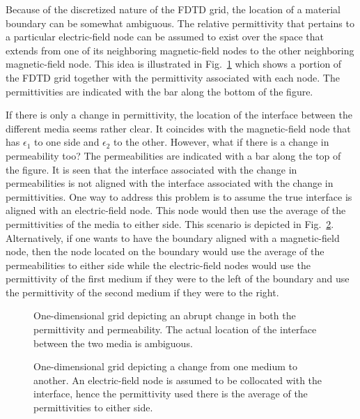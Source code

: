 Because of the discretized nature of the FDTD grid, the location of a
material boundary can be somewhat ambiguous.  The relative
permittivity that pertains to a particular electric-field node can be
assumed to exist over the space that extends from one of its
neighboring magnetic-field nodes to the other neighboring
magnetic-field node.  This idea is illustrated in Fig.\
\ref{fig:abrupt} which shows a portion of the FDTD grid together with
the permittivity associated with each node.  The permittivities are
indicated with the bar along the bottom of the figure.  

If there is only a change in permittivity, the location of the
interface between the different media seems rather clear.  It
coincides with the magnetic-field node that has $\epsilon_1$ to one
side and $\epsilon_2$ to the other.  However, what if there is a
change in permeability too?  The permeabilities are indicated with a
bar along the top of the figure.  It is seen that the interface
associated with the change in permeabilities is not aligned with the
interface associated with the change in permittivities.  One way to
address this problem is to assume the true interface is aligned with
an electric-field node.  This node would then use the average of the
permittivities of the media to either side.  This scenario is depicted
in Fig.\ \ref{fig:average}.  Alternatively, if one wants to have the
boundary aligned with a magnetic-field node, then the node located on
the boundary would use the average of the permeabilities to either
side while the electric-field nodes would use the permittivity of the
first medium if they were to the left of the boundary and use the
permittivity of the second medium if they were to the right.

\begin{figure}
  \begin{center}
  \end{center}
  \caption{One-dimensional grid depicting an abrupt change in both the
  permittivity and permeability.  The actual location of the interface
  between the two media is ambiguous.}
  \label{fig:abrupt}
\end{figure}

\begin{figure}
  \begin{center}
  \end{center}
  \caption{One-dimensional grid depicting a change from one medium to
  another.  An electric-field node is assumed to be collocated with
  the interface, hence the permittivity used there is the average of
  the permittivities to either side.}
  \label{fig:average}
\end{figure}


